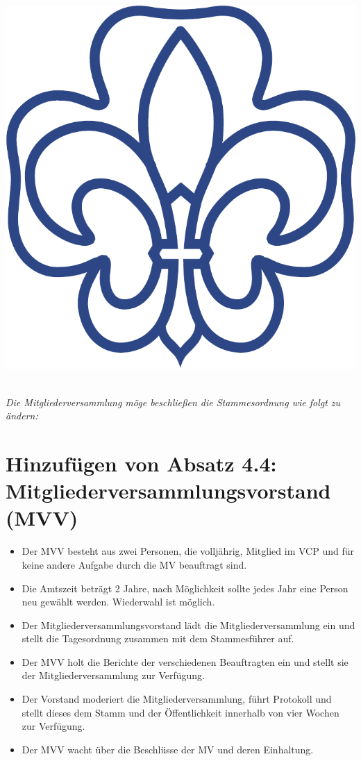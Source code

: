 \documentclass[a4paper]{article}
\begin{document}
\begin{center}
\begin{minipage}{.2\textwidth}
        \includegraphics[width=.85\linewidth]{Zeichen.pdf}
    \end{minipage}%
\end{center}
~\\[0.5cm] 

\emph{Die Mitgliederversammlung möge beschließen die Stammesordnung wie folgt zu ändern:}

\section{Hinzufügen von Absatz 4.4: Mitgliederversammlungsvorstand (MVV)} %
\label{sec:hinzufugen_von_absatz_4_4_mitgliederversammlungsvorstand}
	\begin{itemize}
		\item Der MVV besteht aus zwei Personen, die volljährig, Mitglied im VCP und für keine andere Aufgabe durch die MV beauftragt sind. 
		\item Die Amtszeit beträgt 2 Jahre, nach Möglichkeit sollte jedes Jahr eine Person neu gewählt werden. Wiederwahl ist möglich. 
		\item Der Mitgliederversammlungsvorstand lädt die Mitgliederversammlung ein und stellt die Tagesordnung zusammen mit dem Stammesführer auf. 
		\item Der MVV holt die Berichte der verschiedenen Beauftragten ein und stellt sie der Mitgliederversammlung zur Verfügung. 
		\item Der Vorstand moderiert die Mitgliederversammlung, führt Protokoll und stellt dieses dem Stamm und der Öffentlichkeit innerhalb von vier Wochen zur Verfügung. 
		\item Der MVV wacht über die Beschlüsse der MV und deren Einhaltung. 
	\end{itemize}
\end{document}
